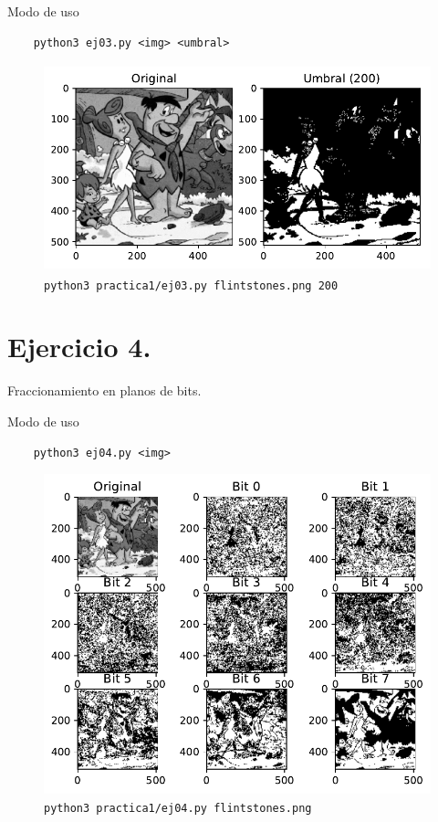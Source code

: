 \documentclass[11pt, spanish]{article}
\begin{document}
Modo de uso
\begin{verbatim}
    python3 ej03.py <img> <umbral>
\end{verbatim}

\begin{figure}[H]
\centering
  \includegraphics[height=6cm]{informe-imgs/ej03.pdf}
  \caption{\texttt{python3 practica1/ej03.py flintstones.png 200}}
\end{figure}


\section{Ejercicio 4.}
Fraccionamiento en planos de bits.

Modo de uso
\begin{verbatim}
    python3 ej04.py <img>
\end{verbatim}

\begin{figure}[H]
\centering
  \includegraphics[width=1\textwidth]{informe-imgs/ej04.pdf}
  \caption{\texttt{python3 practica1/ej04.py flintstones.png}}
\end{figure}
\end{document}
